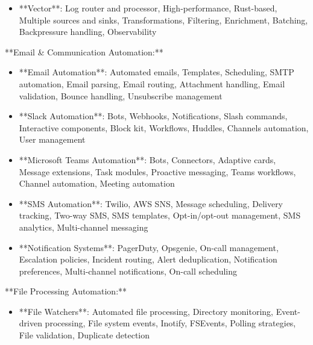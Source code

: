 \documentclass[11pt,a4paper]{article}
\begin{document}
\begin{itemize}
\item **Vector**: Log router and processor, High-performance, Rust-based, Multiple sources and sinks, Transformations, Filtering, Enrichment, Batching, Backpressure handling, Observability
\end{itemize}

**Email \& Communication Automation:**

\begin{itemize}
\item **Email Automation**: Automated emails, Templates, Scheduling, SMTP automation, Email parsing, Email routing, Attachment handling, Email validation, Bounce handling, Unsubscribe management
\end{itemize}

\begin{itemize}
\item **Slack Automation**: Bots, Webhooks, Notifications, Slash commands, Interactive components, Block kit, Workflows, Huddles, Channels automation, User management
\end{itemize}

\begin{itemize}
\item **Microsoft Teams Automation**: Bots, Connectors, Adaptive cards, Message extensions, Task modules, Proactive messaging, Teams workflows, Channel automation, Meeting automation
\end{itemize}

\begin{itemize}
\item **SMS Automation**: Twilio, AWS SNS, Message scheduling, Delivery tracking, Two-way SMS, SMS templates, Opt-in/opt-out management, SMS analytics, Multi-channel messaging
\end{itemize}

\begin{itemize}
\item **Notification Systems**: PagerDuty, Opsgenie, On-call management, Escalation policies, Incident routing, Alert deduplication, Notification preferences, Multi-channel notifications, On-call scheduling
\end{itemize}

**File Processing Automation:**

\begin{itemize}
\item **File Watchers**: Automated file processing, Directory monitoring, Event-driven processing, File system events, Inotify, FSEvents, Polling strategies, File validation, Duplicate detection
\end{itemize}
\end{document}
